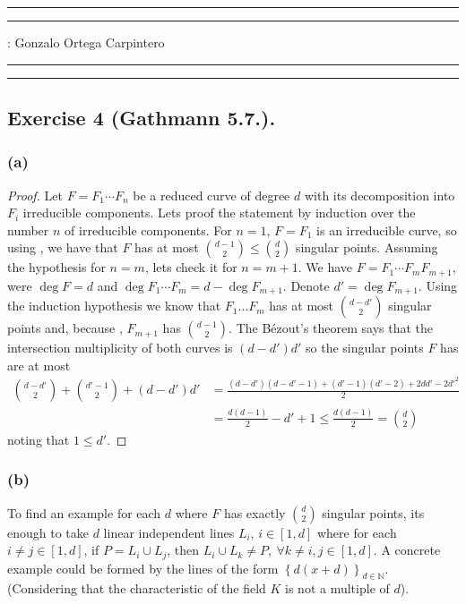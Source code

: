 \documentclass[11pt,a4paper]{article}
\begin{document}
\hrule\hrule
\vspace{1mm}


\vspace{1mm}

 : Gonzalo Ortega Carpintero
\vspace{2mm}

\hrule\hrule

\subsection*{Exercise 4 (Gathmann 5.7.).}
\subsubsection*{(a)}
\begin{proof}
  Let $ F = F_1 \cdots F_n $ be a reduced curve of degree 
  $ d $ with its decomposition into $ F_i $ irreducible components. Lets proof the statement by induction over the number $ n $ of irreducible components. For $ n = 1 $, $ F = F_1 $ is an irreducible curve, so using \cite[Proposition 5.6]{gath}, we have that $ F $ has at most $ \binom{d - 1}{2} \leq \binom{d}{2} $ singular points. Assuming the hypothesis for $ n = m $, lets check it for $ n = m+1$. We have $ F = F_1 \cdots F_m F_{m+1} $, were $ \deg F = d $ and $ \deg F_1 \cdots F_m = d - \deg F_{m+1} $. Denote $d' = \deg F_{m+1} $. Using the induction hypothesis we know that $ F_1 \dots F_m $ has at most $ \binom{d-d'}{2} $ singular points and, because \cite[Proposition 5.6]{gath}, $ F_{m+1} $ has $ \binom{d-1}{2} $. The  Bézout's theorem says that the intersection multiplicity of both curves is $ (d-d')d' $ so the singular points $ F $ has are at most
  \begin{align*}
    \binom{d-d'}{2} + \binom{d' - 1}{2} +(d-d')d' &= \frac{(d-d')(d-d'-1) + (d'-1)(d'-2) + 2dd' - 2d'^2}{2} \\
    &= \frac{d(d-1)}{2} - d' +1 \leq \frac{d(d-1)}{2} = \binom{d}{2}
  \end{align*}
  noting that $ 1 \leq d' $.
\end{proof}

\subsubsection*{(b)}
To find an example for each $ d $ where $ F $ has exactly $ \binom{d}{2} $ singular points, its enough to take $ d $ linear independent lines $ L_i $, $ i \in [1, d] $ where for each $ i \neq j \in [1, d] $, if $ P = L_i \cup L_j $, then $ L_i \cup L_k \neq P, \ \forall k \neq i,j \in [1, d] $. A concrete example could be formed by the lines of the form $ \left\{d(x+d)\right\}_{d \in \mathbb N} $. (Considering that the characteristic of the field $ K $ is not a multiple of $ d $).
\end{document}
